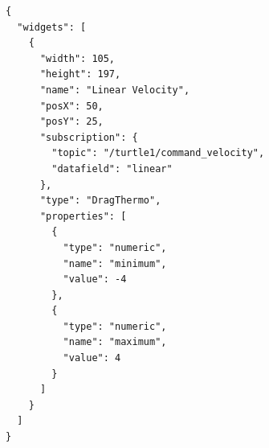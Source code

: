 \begin{lstlisting}[float,frame=single,caption={Example dashboard configuration in JSON.},label=json_example]
{
  "widgets": [
    {
      "width": 105,
      "height": 197,
      "name": "Linear Velocity",
      "posX": 50,
      "posY": 25,
      "subscription": {
        "topic": "/turtle1/command_velocity",
        "datafield": "linear"
      },
      "type": "DragThermo",
      "properties": [
        {
          "type": "numeric",
          "name": "minimum",
          "value": -4
        },
        {
          "type": "numeric",
          "name": "maximum",
          "value": 4
        }
      ]
    }
  ]
}
\end{lstlisting}

